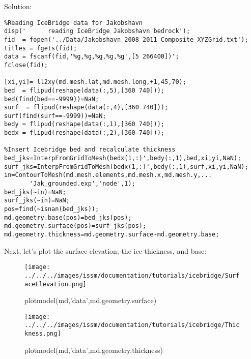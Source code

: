 Solution:
\begin{verbatim}%Reading IceBridge data for Jakobshavn
disp('      reading IceBridge Jakobshavn bedrock');
fid  = fopen('../Data/Jakobshavn_2008_2011_Composite_XYZGrid.txt');
titles = fgets(fid); 
data = fscanf(fid,'%g,%g,%g,%g,%g',[5 266400])';
fclose(fid);

[xi,yi]= ll2xy(md.mesh.lat,md.mesh.long,+1,45,70);
bed  = flipud(reshape(data(:,5),[360 740])); bed(find(bed==-9999))=NaN;
surf  = flipud(reshape(data(:,4),[360 740])); surf(find(surf==-9999))=NaN;
bedy = flipud(reshape(data(:,1),[360 740]));
bedx = flipud(reshape(data(:,2),[360 740]));

%Insert Icebridge bed and recalculate thickness
bed_jks=InterpFromGridToMesh(bedx(1,:)',bedy(:,1),bed,xi,yi,NaN);
surf_jks=InterpFromGridToMesh(bedx(1,:)',bedy(:,1),surf,xi,yi,NaN);
in=ContourToMesh(md.mesh.elements,md.mesh.x,md.mesh.y,...
	   'Jak_grounded.exp','node',1);
bed_jks(~in)=NaN;
surf_jks(~in)=NaN;
pos=find(~isnan(bed_jks));
md.geometry.base(pos)=bed_jks(pos);
md.geometry.surface(pos)=surf_jks(pos);
md.geometry.thickness=md.geometry.surface-md.geometry.base;\end{verbatim}

Next, let's plot the surface elevation, the ice thickness, and base:
\begin{figure}[H]
	\begin{center}
	\texttt{[image: ../../../images/issm/documentation/tutorials/icebridge/SurfaceElevation.png]}
	\caption{plotmodel(md,'data',md.geometry.surface)}
	\end{center}
\end{figure}

\begin{figure}[H]
	\begin{center}
	\texttt{[image: ../../../images/issm/documentation/tutorials/icebridge/Thickness.png]}
	\caption{plotmodel(md,'data',md.geometry.thickness)}
	\end{center}
\end{figure}

